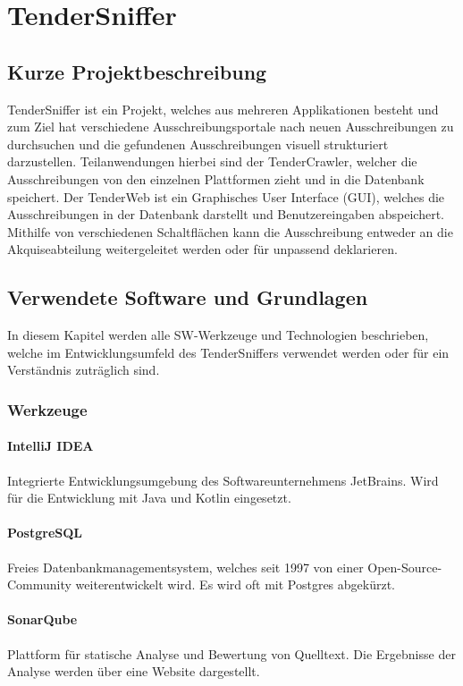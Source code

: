 \chapter{TenderSniffer}

\section{Kurze Projektbeschreibung}
TenderSniffer ist ein Projekt, welches aus mehreren Applikationen besteht und zum Ziel hat verschiedene
Ausschreibungsportale nach neuen Ausschreibungen zu durchsuchen und die gefundenen Ausschreibungen visuell strukturiert
darzustellen. Teilanwendungen hierbei sind der TenderCrawler, welcher die Ausschreibungen von den einzelnen Plattformen
zieht und in die Datenbank speichert. Der TenderWeb ist ein Graphisches User Interface (GUI), welches die
Ausschreibungen in der Datenbank darstellt und Benutzereingaben abspeichert. Mithilfe von verschiedenen Schaltflächen
kann die Ausschreibung entweder an die Akquiseabteilung weitergeleitet werden oder für unpassend deklarieren.

\section{Verwendete Software und Grundlagen}
In diesem Kapitel werden alle SW-Werkzeuge und Technologien beschrieben, welche im Entwicklungsumfeld des TenderSniffers
verwendet werden oder für ein Verständnis zuträglich sind.

\subsection{Werkzeuge}

\subsubsection{IntelliJ IDEA}
Integrierte Entwicklungsumgebung des Softwareunternehmens JetBrains. Wird für die Entwicklung mit Java und Kotlin
eingesetzt. 

\subsubsection{PostgreSQL}
Freies Datenbankmanagementsystem, welches seit 1997 von einer Open-Source-Community weiterentwickelt wird. Es wird oft
mit Postgres abgekürzt.

\subsubsection{SonarQube}
Plattform für statische Analyse und Bewertung von Quelltext. Die Ergebnisse der Analyse werden über eine Website dargestellt.

